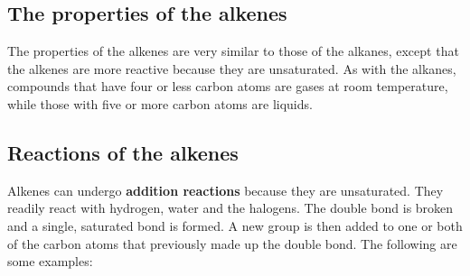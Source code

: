
\subsection{The properties of the alkenes}

The properties of the alkenes are very similar to those of the alkanes, except that the alkenes are more reactive because they are unsaturated. As with the alkanes, compounds that have four or less carbon atoms are gases at room temperature, while those with five or more carbon atoms are liquids.

\subsection{Reactions of the alkenes}

Alkenes can undergo \textbf{addition reactions} because they are unsaturated. They readily react with hydrogen, water and the halogens. The double bond is broken and a single, saturated bond is formed. A new group is then added to one or both of the carbon atoms that previously made up the double bond. The following are some examples:

